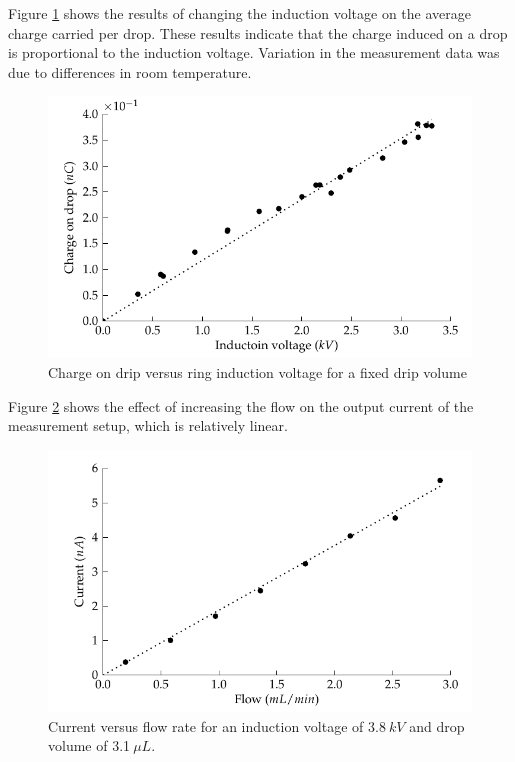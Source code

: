 Figure \ref{Figure_Graph_dripper_chargeVsVoltage} shows the results
of changing the induction voltage on the average charge carried per
drop. These results indicate that the charge induced on a drop is
proportional to the induction voltage. Variation in the measurement
data was due to differences in room temperature.

\begin{figure}
    \includegraphics{content/appendices/chargedWaterDrops/graphics/dripper_chargeVsVoltage}
    \caption{\label{Figure_Graph_dripper_chargeVsVoltage}Charge on drip versus
    ring induction voltage for a fixed drip volume}
\end{figure}


Figure \ref{Figure_Graph_dripper_currentVsFlow} shows the effect
of increasing the flow on the output current of the measurement setup,
which is relatively linear.

\begin{figure}
    \centering
    \includegraphics{content/appendices/chargedWaterDrops/graphics/dripper_currentVsFlow}
    \caption{\label{Figure_Graph_dripper_currentVsFlow}Current versus flow rate
    for an induction voltage of 3.8$\: kV$ and drop volume of 3.1$\:\mu L$.}
\end{figure}




